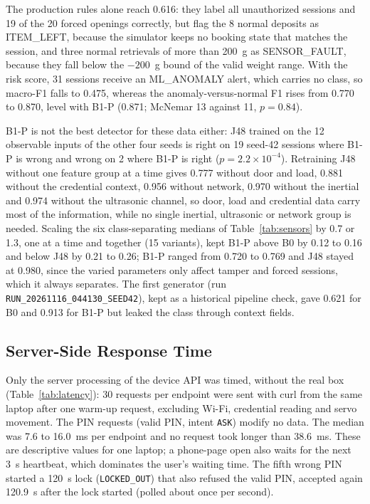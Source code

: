 \documentclass[journal,onecolumn]{IEEEtran}
\begin{document}
The production rules alone reach 0.616: they label all unauthorized sessions and 19 of the 20 forced openings
correctly, but flag the 8 normal deposits as ITEM\_LEFT, because the simulator keeps no booking state that matches
the session, and three normal retrievals of more than 200~g as SENSOR\_FAULT, because they fall below the $-200$~g
bound of the valid weight range. With the risk score, 31 sessions receive an ML\_ANOMALY alert, which carries no
class, so macro-F1 falls to 0.475, whereas the anomaly-versus-normal F1 rises from 0.770 to 0.870, level with B1-P
(0.871; McNemar 13 against 11, $p=0.84$).

B1-P is not the best detector for these data either: J48 trained on the 12 observable inputs of the other four seeds
is right on 19 seed-42 sessions where B1-P is wrong and wrong on 2 where B1-P is right ($p=2.2\times10^{-4}$).
Retraining J48 without one feature group at a time gives 0.777 without door and load, 0.881 without the credential
context, 0.956 without network, 0.970 without the inertial and 0.974 without the ultrasonic channel, so door, load and
credential data carry most of the information, while no single inertial, ultrasonic or network group is needed. Scaling the six class-separating medians
of Table~\ref{tab:sensors} by 0.7 or 1.3, one at a time and together (15 variants), kept B1-P above B0 by 0.12 to
0.16 and below J48 by 0.21 to 0.26; B1-P ranged from 0.720 to 0.769 and J48 stayed at 0.980, since the varied
parameters only affect tamper and forced sessions, which it always separates. The first generator (run
\texttt{RUN\_20261116\_044130\_SEED42}), kept as a historical pipeline check, gave 0.621 for B0 and 0.913 for B1-P but
leaked the class through context fields.

\subsection{Server-Side Response Time}
\label{sec:latency}

Only the server processing of the device API was timed, without the real box (Table~\ref{tab:latency}): 30 requests per
endpoint were sent with curl from the same laptop after one warm-up request, excluding Wi-Fi, credential reading and
servo movement. The PIN requests (valid PIN, intent \texttt{ASK}) modify no data. The median was 7.6 to 16.0~ms per endpoint and no
request took longer than 38.6~ms. These are descriptive values for one laptop; a phone-page open also waits for the next 3~s heartbeat, which dominates
the user's waiting time. The fifth wrong PIN started a 120~s lock (\texttt{LOCKED\_OUT}) that also refused the valid PIN, accepted again 120.9~s after the lock started (polled about once per second).
\end{document}
